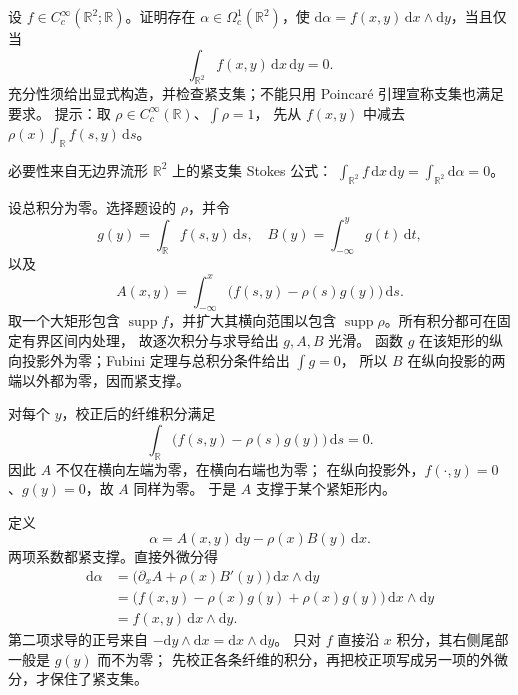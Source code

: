 \begin{optionalexercise}\label{b1:ex:E-compact-primitive-plane}
设 \(f\in C_c^\infty(\mathbb R^2;\mathbb R)\)。证明存在
\(\alpha\in\Omega_c^1(\mathbb R^2)\)，使
\(\mathrm d\alpha=f(x,y)\,\mathrm dx\wedge\mathrm dy\)，当且仅当
\[
 \int_{\mathbb R^2}f(x,y)\,\mathrm dx\,\mathrm dy=0.
\]
充分性须给出显式构造，并检查紧支集；不能只用 Poincaré 引理宣称支集也满足要求。
提示：取 \(\rho\in C_c^\infty(\mathbb R)\)、\(\int\rho=1\)，
先从 \(f(x,y)\) 中减去 \(\rho(x)\int_\mathbb R f(s,y)\,\mathrm ds\)。
\end{optionalexercise}
\begin{solution}
必要性来自无边界流形 \(\mathbb R^2\) 上的紧支集 Stokes 公式：
\(\int_{\mathbb R^2}f\,\mathrm dx\,\mathrm dy
=\int_{\mathbb R^2}\mathrm d\alpha=0\)。

设总积分为零。选择题设的 \(\rho\)，并令
\[
 g(y)=\int_\mathbb R f(s,y)\,\mathrm ds,\quad
 B(y)=\int_{-\infty}^y g(t)\,\mathrm dt,
\]
以及
\[
 A(x,y)=\int_{-\infty}^x
          \bigl(f(s,y)-\rho(s)g(y)\bigr)\,\mathrm ds.
\]
取一个大矩形包含 \(\operatorname{supp}f\)，并扩大其横向范围以包含
\(\operatorname{supp}\rho\)。所有积分都可在固定有界区间内处理，
故逐次积分与求导给出 \(g,A,B\) 光滑。
函数 \(g\) 在该矩形的纵向投影外为零；Fubini 定理与总积分条件给出 \(\int g=0\)，
所以 \(B\) 在纵向投影的两端以外都为零，因而紧支撑。

对每个 \(y\)，校正后的纤维积分满足
\[
 \int_\mathbb R\bigl(f(s,y)-\rho(s)g(y)\bigr)\,\mathrm ds=0.
\]
因此 \(A\) 不仅在横向左端为零，在横向右端也为零；
在纵向投影外，\(f(\cdot,y)=0\)、\(g(y)=0\)，故 \(A\) 同样为零。
于是 \(A\) 支撑于某个紧矩形内。

定义
\[
 \alpha=A(x,y)\,\mathrm dy-\rho(x)B(y)\,\mathrm dx.
\]
两项系数都紧支撑。直接外微分得
\[
 \begin{aligned}
 \mathrm d\alpha
 &=\bigl(\partial_xA+\rho(x)B'(y)\bigr)
                         \,\mathrm dx\wedge\mathrm dy\\
 &=\bigl(f(x,y)-\rho(x)g(y)+\rho(x)g(y)\bigr)
                         \,\mathrm dx\wedge\mathrm dy\\
 &=f(x,y)\,\mathrm dx\wedge\mathrm dy.
 \end{aligned}
\]
第二项求导的正号来自 \(-\mathrm dy\wedge\mathrm dx=\mathrm dx\wedge\mathrm dy\)。
只对 \(f\) 直接沿 \(x\) 积分，其右侧尾部一般是 \(g(y)\) 而不为零；
先校正各条纤维的积分，再把校正项写成另一项的外微分，才保住了紧支集。
\end{solution}
